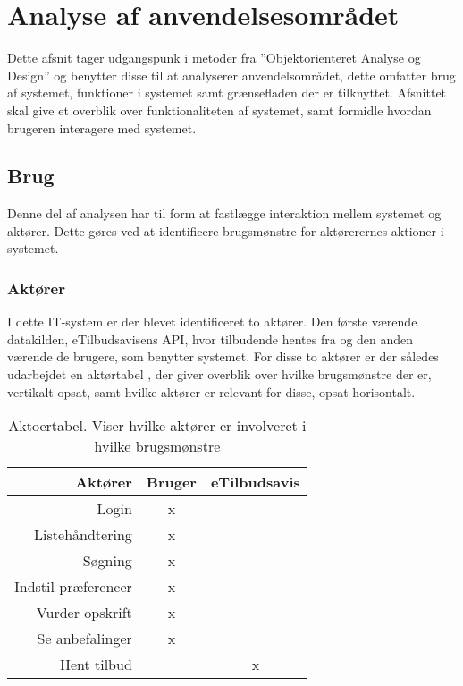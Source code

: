\section{Analyse af anvendelsesområdet}
Dette afsnit tager udgangspunk i metoder fra ''Objektorienteret Analyse og Design'' og benytter disse til at analyserer anvendelsområdet, dette omfatter brug af systemet, funktioner i systemet samt grænsefladen der er tilknyttet.\citep{OOA&D2001} 
Afsnittet skal give et overblik over funktionaliteten af systemet, samt formidle hvordan brugeren interagere med systemet.

\subsection{Brug}
Denne del af analysen har til form at fastlægge interaktion mellem systemet og aktører.
Dette gøres ved at identificere brugsmønstre for aktørerernes aktioner i systemet.
\subsubsection*{Aktører}
I dette IT-system er der blevet identificeret to aktører. 
Den første værende datakilden, eTilbudsavisens API, hvor tilbudende hentes fra og den anden værende de brugere, som benytter systemet.
For disse to aktører er der således udarbejdet en aktørtabel , der giver overblik over hvilke brugsmønstre der er, vertikalt opsat, samt hvilke aktører er relevant for disse, opsat horisontalt.

\begin{table}[h]
\begin{tabular}{r|cc}
\hline
\textbf{Aktører}    & Bruger               & eTilbudsavis         \\ \hline
Login               & x                    & \multicolumn{1}{l}{} \\
Listehåndtering     & x                    & \multicolumn{1}{l}{} \\
Søgning             & x                    & \multicolumn{1}{l}{} \\
Indstil præferencer & x                    &                      \\
Vurder opskrift     & x                    &                      \\
Se anbefalinger     & x                    &                      \\
Hent tilbud         & \multicolumn{1}{l}{} & x                    \\ \hline
\end{tabular}
\caption{Aktoertabel. Viser hvilke aktører er involveret i hvilke brugsmønstre}\label{aktortabel}
\end{table}

